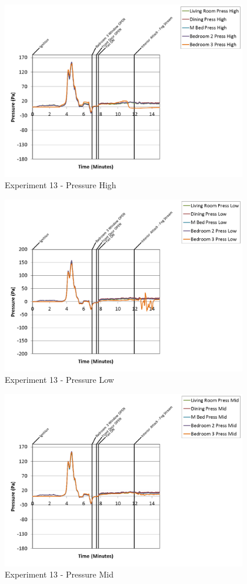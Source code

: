 \documentclass{article}
\begin{document}
\begin{appendices}
\clearpage

\begin{figure}[h!]
	\centering
	\includegraphics[height=3.05in]{0_Images/Results_Charts/Exp_13_Charts/PressureHigh.png}
	\caption{Experiment 13 - Pressure High}
\end{figure}


\begin{figure}[h!]
	\centering
	\includegraphics[height=3.05in]{0_Images/Results_Charts/Exp_13_Charts/PressureLow.png}
	\caption{Experiment 13 - Pressure Low}
\end{figure}

\clearpage

\begin{figure}[h!]
	\centering
	\includegraphics[height=3.05in]{0_Images/Results_Charts/Exp_13_Charts/PressureMid.png}
	\caption{Experiment 13 - Pressure Mid}
\end{figure}



\end{appendices}
\end{document}
